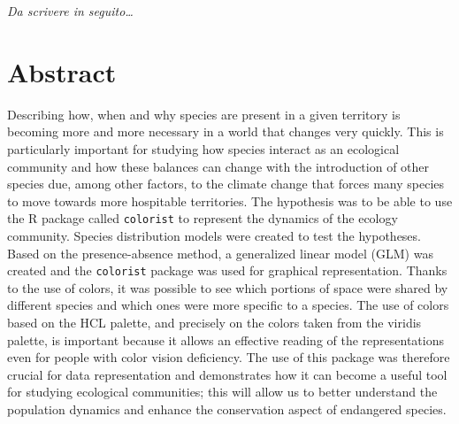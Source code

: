 \documentclass[12pt,a4paper]{article}
\begin{document}
\begin{titlepage}                      
%
\thispagestyle{empty}                   %
\topmargin=6.5cm                        %
\raggedleft                             %
\large                                  %
                                       
\em                                     %
Da scrivere in seguito\ldots                      %
\newpage                                
\clearpage{\pagestyle{empty}\cleardoublepage}%
\end{titlepage}
\linespread{1.2} 
\newpage
\tableofcontents
\linespread{1.5} 
\newpage
\section{Abstract}
 Describing how, when and why species are present in a given territory is becoming more and more necessary in a world that changes very quickly.
This is particularly important for studying how species interact as an ecological community and how these balances can change with the introduction of other species due, among other factors, to the climate change that forces many species to move towards more hospitable territories.
The hypothesis was to be able to use the R package called \texttt{colorist} to represent the dynamics of the ecology community.
Species distribution models were created to test the hypotheses. Based on the presence-absence method, a generalized linear model (GLM) was created and the \texttt{colorist} package was used for graphical representation.
Thanks to the use of colors, it was possible to see which portions of space were shared by different species and which ones were more specific to a species.
The use of colors based on the HCL palette, and precisely on the colors taken from the viridis palette, is important because it allows an effective reading of the representations even for people with color vision deficiency.
The use of this package was therefore crucial for data representation and demonstrates how it can become a useful tool for studying ecological communities; this will allow us to better understand the population dynamics and enhance the conservation aspect of endangered species.
 
\end{document}
